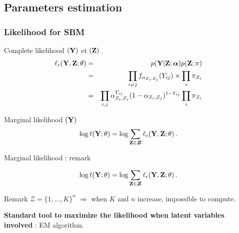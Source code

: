 \documentclass[compress,10pt]{beamer}
\begin{document}
\subsection{Parameters estimation}
\begin{frame} \frametitle{Likelihood for SBM}

 \begin{block}{Complete  likelihood $(\mathbf{Y})$  et  $(\mathbf{Z})$}
 \begin{eqnarray}\label{eq:lik}
\ell_c(\mathbf{Y},\mathbf{Z}; \theta) &=& p(\mathbf{Y} | \mathbf{Z}; \boldsymbol{\alpha}) p(\mathbf{Z} ; \mathbf{\pi})\nonumber  \\
&=& \prod_{i  \neq j} f_{\alpha_{Z_i,Z_j}}(Y_{ij}) \times   \prod_{i} \pi_{Z_i} \nonumber  \\
&=&  \prod_{i,j} \alpha_{Z_i,Z_j}^{Y_{ij}} (1-  \alpha_{Z_i,Z_j})^{1- Y_{ij}}    \prod_{i} \pi_{Z_i} \nonumber
\end{eqnarray}
 
 \end{block}
 

\begin{block}{Marginal likelihood $(\mathbf{Y})$}
\begin{equation}\label{eq:vraismarg}
\log \ell(\mathbf{Y}; \theta) =\log \sum_{\mathbf{Z} \in \boldsymbol{\mathcal{Z}}} \ell_c(\mathbf{Y},\mathbf{Z}; \theta) \,.
\end{equation}
 \end{block}
 

 \end{frame}
 

 
 
 

 \begin{frame}{Marginal likelihood  : remark }
 
 $$
\log \ell(\mathbf{Y}; \theta) =\log \sum_{\mathbf{Z} \in \boldsymbol{\mathcal{Z}}} \ell_c(\mathbf{Y},\mathbf{Z}; \theta) \,.
$$
 
  \begin{block}{Remark}
$\boldsymbol{\mathcal{Z}} =   \{1,\dots, K\}^{n}$ \color{dgreen} $\Rightarrow$ \color{black}  when  $K$ and $n$ increase, impossible to compute. 
 \end{block}
 
\color{dgreen} \textbf{Standard tool to maximize the likelihood when latent variables involved} \color{black} : EM  algorithm.  
 
 \end{frame}
 
\end{document}
